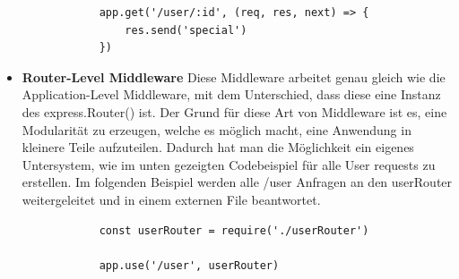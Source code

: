 \begin{itemize}
\begin{lstlisting}
            app.get('/user/:id', (req, res, next) => {
                res.send('special')
            })
        \end{lstlisting}
    \item \textbf{Router-Level Middleware}
        \newline
        Diese Middleware arbeitet genau gleich wie die Application-Level Middleware, mit dem Unterschied, dass diese eine Instanz des express.Router() ist. Der Grund für diese Art von Middleware ist es, eine Modularität zu erzeugen, welche es möglich macht, eine Anwendung in kleinere Teile aufzuteilen. Dadurch hat man die Möglichkeit ein eigenes Untersystem, wie im unten gezeigten Codebeispiel für alle User requests zu erstellen. Im folgenden Beispiel werden alle /user Anfragen an den userRouter weitergeleitet und in einem externen File beantwortet.
        \begin{lstlisting}
            const userRouter = require('./userRouter')
            
            app.use('/user', userRouter)
        \end{lstlisting}


\end{itemize}
